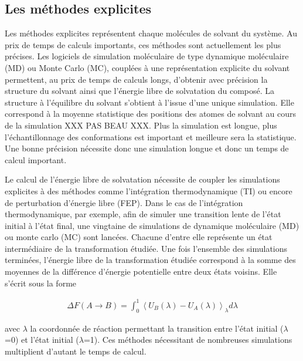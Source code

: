 \subsection{Les méthodes explicites}
Les méthodes explicites représentent chaque molécules de solvant du système. Au prix de temps de calculs importants, ces méthodes sont actuellement les plus précises. Les logiciels de simulation moléculaire de type dynamique moléculaire (MD) ou Monte Carlo (MC), couplées à une représentation explicite du solvant permettent, au prix de temps de calculs longs, d'obtenir avec précision la structure du solvant ainsi que l'énergie libre de solvatation du composé. La structure à l'équilibre du solvant s'obtient à l'issue d'une unique simulation. Elle correspond à la moyenne statistique des positions des atomes de solvant au cours de la simulation XXX PAS BEAU XXX. Plus la simulation est longue, plus l’échantillonnage des conformations est important et meilleure sera la statistique. Une bonne précision nécessite donc une simulation longue et donc un temps de calcul important.

Le calcul de l'énergie libre de solvatation nécessite de coupler les simulations explicites à des méthodes comme l'intégration thermodynamique (TI) ou encore de perturbation d'énergie libre (FEP)\cite{Skyner_review_2015, Hansen_Practical_2014, Christ_basic_2009}. Dans le cas de l'intégration thermodynamique, par exemple, afin de simuler une transition lente de l'état initial à l'état final, une vingtaine de simulations de dynamique moléculaire (MD) ou monte carlo (MC) sont lancées. Chacune d'entre elle représente un état intermédiaire de la transformation étudiée. Une fois l'ensemble des simulations terminées, l'énergie libre de la transformation étudiée correspond à la somme des moyennes de la différence d'énergie potentielle entre deux états voisins. Elle s'écrit sous la forme

\begin{eqnarray}
\Delta F(A \rightarrow B) =  \int_0^1 \left\langle U_B(\lambda) - U_A(\lambda) \right\rangle_{\lambda} d\lambda
\end{eqnarray}

\noindent avec $\lambda$ la coordonnée de réaction permettant la transition entre l'état initial ($\lambda$=0) et l'état initial ($\lambda$=1).
Ces méthodes nécessitant de nombreuses simulations multiplient d'autant le temps de calcul.


